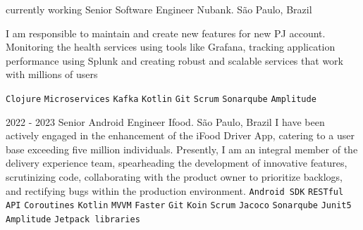 \documentclass[9pt]{developercv} %
\begin{document}
\begin{entrylist}
	\entry
		{currently working}
		{Senior Software Engineer}
		{Nubank. São Paulo, Brazil}
{
I am responsible to maintain and create new features for new PJ account.
Monitoring the health services using tools like Grafana, tracking application performance using Splunk and creating robust and scalable services that work with millions of users

 	{
 		\texttt{Clojure}\slashsep
		 \texttt{Microservices}\slashsep
		 \texttt{Kafka}\slashsep
		 \texttt{Kotlin}\slashsep
		 \texttt{Git}\slashsep
		 \texttt{Scrum}\slashsep
		 \texttt{Sonarqube}\slashsep
		 \texttt{Amplitude}\slashsep
	}
}

\end{entrylist}
\begin{entrylist}
	\entry
		{2022 - 2023}
		{Senior Android Engineer}
		{Ifood. São Paulo, Brazil}
{
I have been actively engaged in the enhancement of the iFood Driver App, catering to a user base exceeding five million individuals. Presently, I am an integral member of the delivery experience team, spearheading the development of innovative features, scrutinizing code, collaborating with the product owner to prioritize backlogs, and rectifying bugs within the production environment.
 	{
 		\texttt{Android SDK}\slashsep
		 \texttt{RESTful API}\slashsep
		 \texttt{Coroutines}\slashsep
		 \texttt{Kotlin}\slashsep
		 \texttt{MVVM}\slashsep
		 \texttt{Faster}\slashsep
		 \texttt{Git}\slashsep
		 \texttt{Koin}\slashsep
		 \texttt{Scrum}\slashsep
		 \texttt{Jacoco}\slashsep
		 \texttt{Sonarqube}\slashsep
		 \texttt{Junit5}\slashsep
		 \texttt{Amplitude}\slashsep
		 \texttt{Jetpack libraries}\slashsep
	}
}

\end{entrylist}
\end{document}
